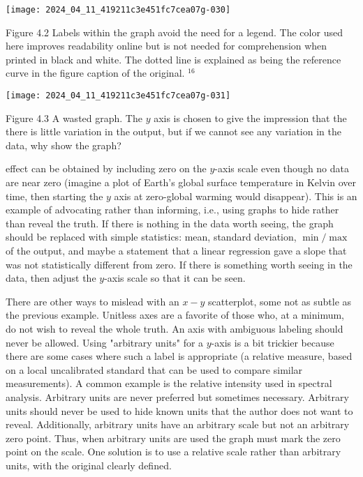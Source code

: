 \begin{center}
\texttt{[image: 2024\_04\_11\_419211c3e451fc7cea07g-030]}
\end{center}

Figure 4.2 Labels within the graph avoid the need for a legend. The color used here improves readability online but is not needed for comprehension when printed in black and white. The dotted line is explained as being the reference curve in the figure caption of the original. ${ }^{16}$

\begin{center}
\texttt{[image: 2024\_04\_11\_419211c3e451fc7cea07g-031]}
\end{center}

Figure 4.3 A wasted graph. The $y$ axis is chosen to give the impression that the there is little variation in the output, but if we cannot see any variation in the data, why show the graph?

effect can be obtained by including zero on the $y$-axis scale even though no data are near zero (imagine a plot of Earth's global surface temperature in Kelvin over time, then starting the $y$ axis at zero-global warming would disappear). This is an example of advocating rather than informing, i.e., using graphs to hide rather than reveal the truth. If there is nothing in the data worth seeing, the graph should be replaced with simple statistics: mean, standard deviation, $\min / \max$ of the output, and maybe a statement that a linear regression gave a slope that was not statistically different from zero. If there is something worth seeing in the data, then adjust the $y$-axis scale so that it can be seen.

There are other ways to mislead with an $x-y$ scatterplot, some not as subtle as the previous example. Unitless axes are a favorite of those who, at a minimum, do not wish to reveal the whole truth. An axis with ambiguous labeling should never be allowed. Using "arbitrary units" for a $y$-axis is a bit trickier because there are some cases where such a label is appropriate (a relative measure, based on a local uncalibrated standard that can be used to compare similar measurements). A common example is the relative intensity used in spectral analysis. Arbitrary units are never preferred but sometimes necessary. Arbitrary units should never be used to hide known units that the author does not want to reveal. Additionally, arbitrary units have an arbitrary scale but not an arbitrary zero point. Thus, when arbitrary units are used the graph must mark the zero point on the scale. One solution is to use a relative scale rather than arbitrary units, with the original clearly defined.

